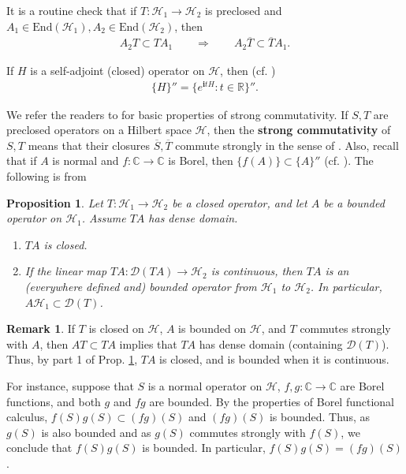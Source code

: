 \documentclass[12pt,a4paper,notitlepage]{article}
\theoremstyle{definition}
\newtheorem{rem}[df]{Remark}
\theoremstyle{plain}
\newtheorem{pp}[df]{Proposition}
\newcommand{\mc}{\mathcal}
\newcommand{\ovl}{\overline}
\newcommand{\End}{\mathrm{End}} %
\newcommand{\Dom}{\scr D}
\newcommand{\scr}{\mathscr}
\newcommand{\im}{\mathbf{i}}
\newcommand{\Cbb}{\mathbb C}
\newcommand{\Rbb}{\mathbb R}
\numberwithin{equation}{subsection}
\begin{document}
It is a routine check that if $T:\mc H_1\rightarrow\mc H_2$ is preclosed and $A_1\in\End(\mc H_1),A_2\in\End(\mc H_2)$, then
\begin{align*}
A_2T\subset TA_1\qquad\Longrightarrow\qquad A_2\ovl T\subset \ovl TA_1.	
\end{align*}

If $H$ is a self-adjoint (closed) operator on $\mc H$, then (cf. \cite[Sec. 10]{G-Sp})
\begin{align*}
\{H\}''=\{e^{\im tH}:t\in\Rbb\}''.	
\end{align*}


We refer the readers to \cite[Sec. 6]{G-Sp} for basic properties of strong commutativity. If $S,T$ are preclosed operators on a Hilbert space $\mc H$, then the \textbf{strong commutativity} of $S,T$ means that their closures $\ovl S,\ovl T$ commute strongly in the sense of \cite[Sec. 6]{G-Sp}. Also, recall that if $A$ is normal and $f:\Cbb\rightarrow\Cbb$ is Borel, then $\{f(A)\}\subset\{A\}''$ (cf. \cite[Sec. 9]{G-Sp}). The following is from \cite[Sec. 8]{G-Sp}

\begin{pp}\label{lb1}
Let $T:\mc H_1\rightarrow\mc H_2$ be a closed operator, and let $A$ be a bounded operator on $\mc H_1$. Assume $TA$ has dense domain. 
\begin{enumerate}
\item $TA$ is closed.
\item If the linear map $TA:\Dom(TA)\rightarrow\mc H_2$ is continuous, then $TA$ is an (everywhere defined and) bounded operator from $\mc H_1$ to $\mc H_2$. In particular, $A\mc H_1\subset\Dom(T)$.
	\end{enumerate}
\end{pp}


\begin{rem}\label{lb4}
If $T$ is closed on $\mc H$, $A$ is bounded on $\mc H$, and $T$ commutes strongly with $A$, then $AT\subset TA$ implies that $TA$ has dense domain (containing $\Dom(T)$). Thus, by part 1 of Prop. \ref{lb1}, $TA$ is closed, and is bounded when it is continuous.

For instance, suppose that $S$ is a normal operator on $\mc H$, $f,g:\Cbb\rightarrow\Cbb$ are Borel functions, and both $g$ and $fg$ are bounded. By the properties of Borel functional calculus, $f(S)g(S)\subset (fg)(S)$ and $(fg)(S)$ is bounded. Thus, as $g(S)$ is also bounded and as $g(S)$ commutes strongly with $f(S)$, we conclude that $f(S)g(S)$ is bounded. In particular, $f(S)g(S)=(fg)(S)$.  
\end{rem}
\end{document}
